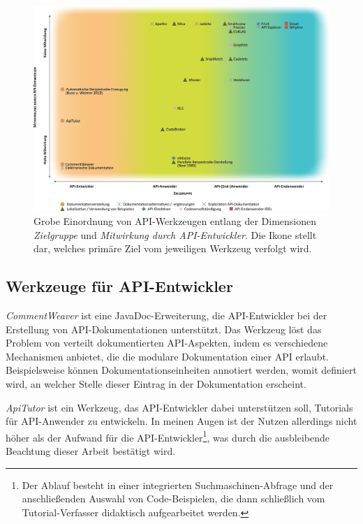 \thispagestyle{empty}
\begin{landscape}
\begin{figure}
  \centering
    \includegraphics[width=0.87\linewidth]{Figures/tools/api-tools.png}
  \caption[Einteilung von API-Werkzeugen]{Grobe Einordnung von API-Werkzeugen entlang der Dimensionen \textit{Zielgruppe} und \textit{Mitwirkung durch API-Entwickler}. Die Ikone stellt dar, welches primäre Ziel vom jeweiligen Werkzeug verfolgt wird.}
  \label{fig:api-tools}
\end{figure}
\end{landscape}
\restoregeometry





\subsection{Werkzeuge für API-Entwickler}

\textit{CommentWeaver} \citep{Horie:2010dq} ist eine JavaDoc-Erweiterung, die API-Entwickler bei der Erstellung von API-Dokumentationen unterstützt. Das Werkzeug löst das Problem von verteilt dokumentierten API-Aspekten, indem es verschiedene Mechanismen anbietet, die die modulare Dokumentation einer API erlaubt. Beispielsweise können Dokumentationseinheiten annotiert werden, womit definiert wird, an welcher Stelle dieser Eintrag in der Dokumentation erscheint.

\textit{ApiTutor} \citep{Dahotre:2011vr} ist ein Werkzeug, das API-Entwickler dabei unterstützen soll, Tutorials für API-Anwender zu entwickeln. In meinen Augen ist der Nutzen allerdings nicht höher als der Aufwand für die API-Entwickler\footnote{Der Ablauf besteht in einer integrierten Suchmaschinen-Abfrage und der anschließenden Auswahl von Code-Beispielen, die dann schließlich vom Tutorial-Verfasser didaktisch aufgearbeitet werden.}, was durch die ausbleibende Beachtung dieser Arbeit bestätigt wird.

